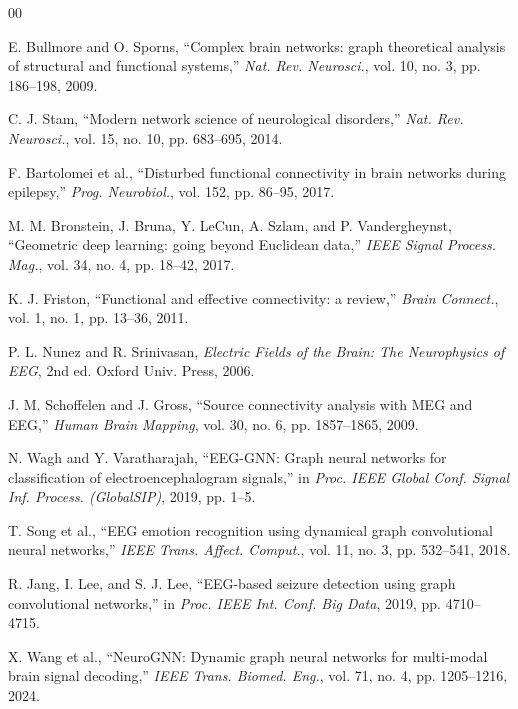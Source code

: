 \documentclass[journal]{IEEEtran}
\begin{document}

\begin{thebibliography}{00}

 E. Bullmore and O. Sporns, ``Complex brain networks: graph theoretical analysis of structural and functional systems,'' \textit{Nat. Rev. Neurosci.}, vol. 10, no. 3, pp. 186--198, 2009.

 C. J. Stam, ``Modern network science of neurological disorders,'' \textit{Nat. Rev. Neurosci.}, vol. 15, no. 10, pp. 683--695, 2014.

 F. Bartolomei et al., ``Disturbed functional connectivity in brain networks during epilepsy,'' \textit{Prog. Neurobiol.}, vol. 152, pp. 86--95, 2017.

 M. M. Bronstein, J. Bruna, Y. LeCun, A. Szlam, and P. Vandergheynst, ``Geometric deep learning: going beyond Euclidean data,'' \textit{IEEE Signal Process. Mag.}, vol. 34, no. 4, pp. 18--42, 2017.

 K. J. Friston, ``Functional and effective connectivity: a review,'' \textit{Brain Connect.}, vol. 1, no. 1, pp. 13--36, 2011.

 P. L. Nunez and R. Srinivasan, \textit{Electric Fields of the Brain: The Neurophysics of EEG}, 2nd ed. Oxford Univ. Press, 2006.

 J. M. Schoffelen and J. Gross, ``Source connectivity analysis with MEG and EEG,'' \textit{Human Brain Mapping}, vol. 30, no. 6, pp. 1857--1865, 2009.

 N. Wagh and Y. Varatharajah, ``EEG-GNN: Graph neural networks for classification of electroencephalogram signals,'' in \textit{Proc. IEEE Global Conf. Signal Inf. Process. (GlobalSIP)}, 2019, pp. 1--5.

 T. Song et al., ``EEG emotion recognition using dynamical graph convolutional neural networks,'' \textit{IEEE Trans. Affect. Comput.}, vol. 11, no. 3, pp. 532--541, 2018.

 R. Jang, I. Lee, and S. J. Lee, ``EEG-based seizure detection using graph convolutional networks,'' in \textit{Proc. IEEE Int. Conf. Big Data}, 2019, pp. 4710--4715.

 X. Wang et al., ``NeuroGNN: Dynamic graph neural networks for multi-modal brain signal decoding,'' \textit{IEEE Trans. Biomed. Eng.}, vol. 71, no. 4, pp. 1205--1216, 2024.


\end{thebibliography}
\end{document}
